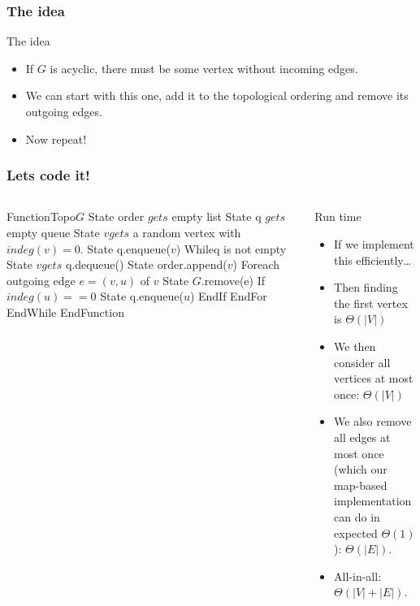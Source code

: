 \begin{frame}
	\frametitle{The idea}
	\begin{overlayarea}{\textwidth}{\textheight}
		\begin{block}{The idea}
			\begin{itemize}
				\item 
					If $G$ is acyclic, there must be some vertex without incoming edges.\\
				\item<3->
					We can start with this one, add it to the topological ordering and remove its outgoing edges.\\
				\item<4->
					Now repeat!
			\end{itemize}
		\end{block}	
	\end{overlayarea}
\end{frame}

\begin{frame}
	\frametitle{Lets code it!}
	
	\begin{columns}
		{
	\small
	\begin{block}
		Function{Topo}{$G$}
		State order $gets$ empty list
		State q $gets$ empty queue
		\pause
		State $v gets$ a random vertex with $\mathit{indeg}(v) = 0$.
		State q.enqueue($v$)
		\pause
		While{q is not empty}
		State $v gets$ q.dequeue()
		State order.append($v$)
		\pause
		For{each outgoing edge $e=(v,u)$ of $v$}
		State $G$.remove(e)
		\pause
		If{$\mathit{indeg}(u) == 0$}
		State q.enqueue($u$)
		\pause
		EndIf
		EndFor
		EndWhile
		EndFunction
	\end{block}
}
			
		\column{0.405\textwidth}
			\begin{block}{Run time}
				\begin{itemize}
					\item If we implement this efficiently\dots
						\pause
					\item Then finding the first vertex is $\Theta(|V|)$
						\pause
					\item We then consider all vertices at most once: $\Theta(|V|)$
						\pause
					\item We also remove all edges at most once (which our map-based implementation can do in expected
						$\Theta(1)$): $\Theta(|E|)$.
					\item All-in-all: $\Theta(|V| + |E|)$.
				\end{itemize}	
			\end{block}	
			
	\end{columns}
\end{frame}

